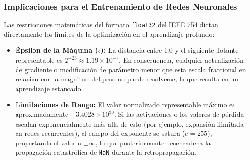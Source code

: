 \documentclass[12pt]{article}
\begin{document}
\subsubsection*{Implicaciones para el Entrenamiento de Redes Neuronales}
Las restricciones matemáticas del formato \texttt{float32} del IEEE 754 dictan directamente los límites de la optimización en el aprendizaje profundo:
\begin{itemize}
    \item \textbf{Épsilon de la Máquina ($\epsilon$):} La distancia entre 1.0 y el siguiente flotante representable es $2^{-23} \approx 1.19 \times 10^{-7}$. En consecuencia, cualquier actualización de gradiente o modificación de parámetro menor que esta escala fraccional en relación con la magnitud del peso no puede resolverse, lo que resulta en un aprendizaje estancado.
    \item \textbf{Limitaciones de Rango:} El valor normalizado representable máximo es aproximadamente $\pm 3.4028 \times 10^{38}$. Si las activaciones o los valores de pérdida escalan exponencialmente más allá de esto (por ejemplo, expansión ilimitada en redes recurrentes), el campo del exponente se satura ($e=255$), proyectando el valor a $\pm\infty$, lo que posteriormente desencadena la propagación catastrófica de \texttt{NaN} durante la retropropagación.
\end{itemize}
\end{document}
